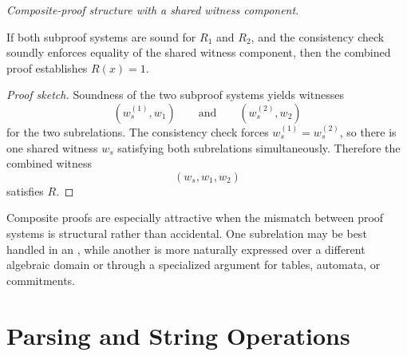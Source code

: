 \documentclass[11pt]{article}
\begin{document}
\begin{center}

\smallskip
\emph{Composite-proof structure with a shared witness component.}
\end{center}

\begin{proposition}
If both subproof systems are sound for $R_1$ and $R_2$, and the consistency
check soundly enforces equality of the shared witness component, then the
combined proof establishes $R(x)=1$.
\end{proposition}

\begin{proof}[Proof sketch]
Soundness of the two subproof systems yields witnesses
\[
  (w_s^{(1)},w_1)
  \qquad\text{and}\qquad
  (w_s^{(2)},w_2)
\]
for the two subrelations.  The consistency check forces
$w_s^{(1)}=w_s^{(2)}$, so there is one shared witness $w_s$ satisfying both
subrelations simultaneously.  Therefore the combined witness
\[
  (w_s,w_1,w_2)
\]
satisfies $R$.
\end{proof}

Composite proofs are especially attractive when the mismatch between proof
systems is structural rather than accidental.  One subrelation may be best
handled in an , while another is more naturally expressed over a
different algebraic domain or through a specialized argument for tables,
automata, or commitments.

\section{Parsing and String Operations}
\end{document}
